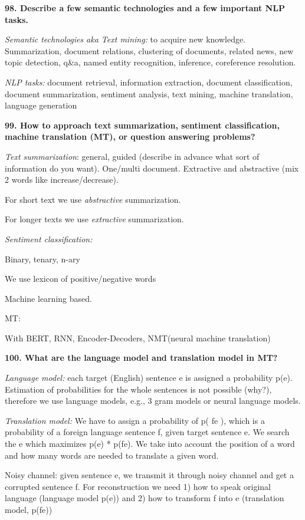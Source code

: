\textbf{98. Describe a few semantic technologies and a few important NLP
tasks.}

\textit{Semantic technologies aka Text mining:} to acquire new
knowledge. Summarization, document relations, clustering of documents,
related news, new topic detection, q\&a, named entity recognition,
inference, coreference resolution.

\textit{NLP tasks:} document retrieval, information extraction, document 
classification, document summarization, sentiment analysis, text mining, 
machine translation, language generation

\textbf{99. How to approach text summarization, sentiment
classification, machine translation (MT), or question answering
problems?}

\textit{Text summarization}: general, guided (describe in advance
what sort of information do you want). One/multi document. Extractive
and abstractive (mix 2 words like increase/decrease).

For short text we use \emph{abstractive} summarization.

For longer texts we use \emph{extractive} summarization.

\textit{Sentiment classification:}

Binary, tenary, n-ary

We use lexicon of positive/negative words

Machine learning based.

MT:

With BERT, RNN, Encoder-Decoders, NMT(neural machine translation)

\textbf{100. What are the language model and translation model in MT?}

\textit{Language model:} each target (English) sentence e is assigned
a probability p(e). Estimation of probabilities for the whole sentences
is not possible (why?), therefore we use language models, e.g., 3 gram
models or neural language models.

\textit{Translation model:} We have to assign a probability of p(
f\textbar e ), which is a probability of a foreign language sentence f,
given target sentence e. We search the e which maximizes p(e) *
p(f\textbar e). We take into account the position of a word and how many
words are needed to translate a given word.

Noisy channel: given sentence e, we transmit it through noisy channel
and get a corrupted sentence f. For reconstruction we need 1) how to
speak original language (language model p(e)) and 2) how to transform f
into e (translation model, p(f\textbar e))

